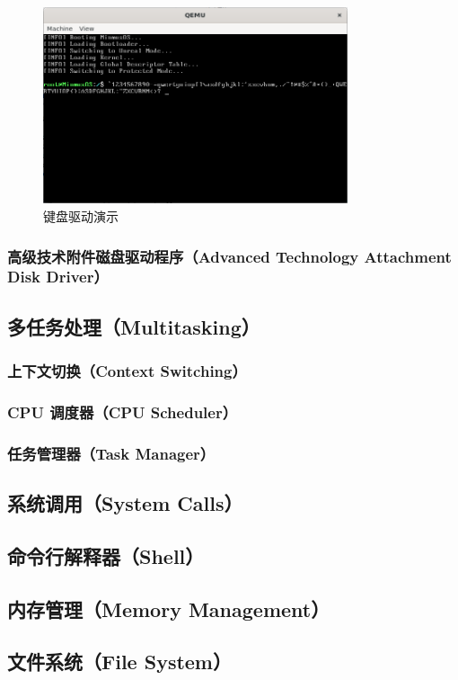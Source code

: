 \begin{figure}[htbp]
    \centering
    \includegraphics[width=0.8\textwidth]{figures/KeyboardDriverPresentation.png}
    \caption{键盘驱动演示}
    \label{fig:KeyboardDriverPresentation}
\end{figure}

\subsubsection{高级技术附件磁盘驱动程序（Advanced Technology Attachment Disk Driver）}

\subsection{多任务处理（Multitasking）}

\subsubsection{上下文切换（Context Switching）}

\subsubsection{CPU 调度器（CPU Scheduler）}

\subsubsection{任务管理器（Task Manager）}

\subsection{系统调用（System Calls）}

\subsection{命令行解释器（Shell）}

\subsection{内存管理（Memory Management）}

\subsection{文件系统（File System）}